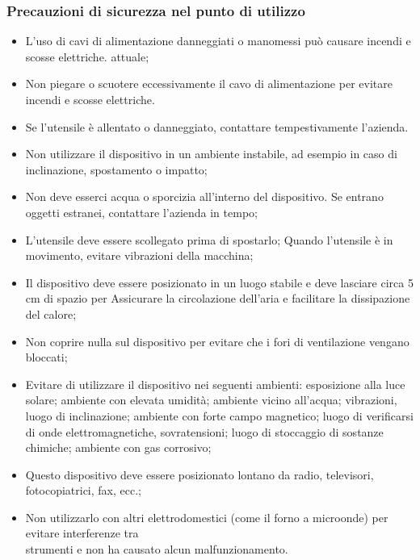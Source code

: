 \documentclass[a4paper]{article}
\begin{document}
\subsubsection{Precauzioni di sicurezza nel punto di utilizzo}
\begin{itemize}
  \item L'uso di cavi di alimentazione danneggiati o manomessi può causare incendi e scosse elettriche. attuale;
  \item Non piegare o scuotere eccessivamente il cavo di alimentazione per evitare incendi e scosse elettriche.
  \item Se l'utensile è allentato o danneggiato, contattare tempestivamente l'azienda.
  \item Non utilizzare il dispositivo in un ambiente instabile, ad esempio in caso di inclinazione, spostamento o impatto;
  \item Non deve esserci acqua o sporcizia all'interno del dispositivo. Se entrano oggetti estranei, contattare l'azienda in tempo;
  \item L'utensile deve essere scollegato prima di spostarlo; Quando l'utensile è in movimento, evitare vibrazioni della macchina;
  \item Il dispositivo deve essere posizionato in un luogo stabile e deve lasciare circa 5 cm di spazio per Assicurare la circolazione dell'aria e facilitare la dissipazione del calore;
  \item Non coprire nulla sul dispositivo per evitare che i fori di ventilazione vengano bloccati;
  \item Evitare di utilizzare il dispositivo nei seguenti ambienti: esposizione alla luce solare; ambiente con elevata umidità; ambiente vicino all'acqua; vibrazioni, luogo di inclinazione; ambiente con forte campo magnetico; luogo di verificarsi di onde elettromagnetiche, sovratensioni; luogo di stoccaggio di sostanze chimiche; ambiente con gas corrosivo;
  \item Questo dispositivo deve essere posizionato lontano da radio, televisori, fotocopiatrici, fax, ecc.;
  \item Non utilizzarlo con altri elettrodomestici (come il forno a microonde) per evitare interferenze tra\\
strumenti e non ha causato alcun malfunzionamento.
\end{itemize}
\end{document}
